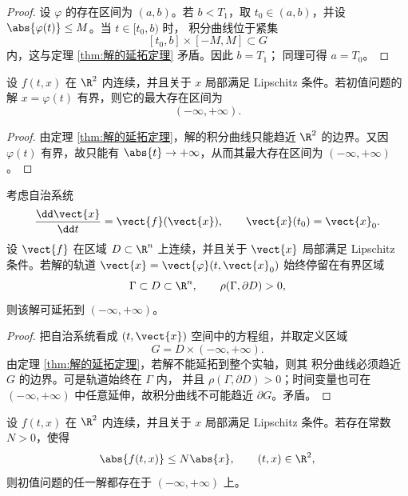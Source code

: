 \begin{proof}
	设 $\varphi$ 的存在区间为 $(a,b)$。若 $b<T_1$，取
	$t_0\in(a,b)$，并设 $\abs{\varphi(t)}\leq M$。当 $t\in[t_0,b)$ 时，
	积分曲线位于紧集
	\[
		[t_0,b]\times[-M,M]\subset G
	\]
	内，这与定理 \ref{thm:解的延拓定理} 矛盾。因此 $b=T_1$；
	同理可得 $a=T_0$。
\end{proof}

\begin{corollary}[全空间中有界解的全局存在性]
	\label{cor:全空间中有界解的全局存在性}
	设 $f(t,x)$ 在 $\R^2$ 内连续，并且关于 $x$ 局部满足 Lipschitz
	条件。若初值问题的解 $x=\varphi(t)$ 有界，则它的最大存在区间为
	\[
		(-\infty,+\infty).
	\]
\end{corollary}

\begin{proof}
	由定理 \ref{thm:解的延拓定理}，解的积分曲线只能趋近
	$\R^2$ 的边界。又因 $\varphi(t)$ 有界，故只能有
	$\abs{t}\to+\infty$，从而其最大存在区间为
	$(-\infty,+\infty)$。
\end{proof}

\begin{theorem}[自治系统的有界内陷区域]\label{thm:自治系统的有界内陷区域}
	考虑自治系统
	\[
		\dfrac{\dd\vect{x}}{\dd t}=\vect{f}(\vect{x}),
		\qquad
		\vect{x}(t_0)=\vect{x}_0.
	\]
	设 $\vect{f}$ 在区域 $D\subset\R^n$ 上连续，并且关于
	$\vect{x}$ 局部满足 Lipschitz 条件。若解的轨道
	$\vect{x}=\vect{\varphi}(t,\vect{x}_0)$ 始终停留在有界区域
	\[
		\Gamma\subset D\subset\R^n,
		\qquad
		\rho(\Gamma,\partial D)>0,
	\]
	则该解可延拓到 $(-\infty,+\infty)$。
\end{theorem}

\begin{proof}
	把自治系统看成 $(t,\vect{x})$ 空间中的方程组，并取定义区域
	\[
		G=D\times(-\infty,+\infty).
	\]
	由定理 \ref{thm:解的延拓定理}，若解不能延拓到整个实轴，则其
	积分曲线必须趋近 $G$ 的边界。可是轨道始终在 $\Gamma$ 内，
	并且 $\rho(\Gamma,\partial D)>0$；时间变量也可在
	$(-\infty,+\infty)$ 中任意延伸，故积分曲线不可能趋近
	$\partial G$。矛盾。
\end{proof}

\begin{theorem}[线性增长条件下的全局存在性]
	\label{cor:线性增长条件下的全区间存在性}
	设 $f(t,x)$ 在 $\R^2$ 内连续，并且关于 $x$ 局部满足 Lipschitz
	条件。若存在常数 $N>0$，使得
	\[
		\abs{f(t,x)}\leq N\abs{x},
		\qquad (t,x)\in\R^2,
	\]
	则初值问题的任一解都存在于 $(-\infty,+\infty)$ 上。
\end{theorem}

